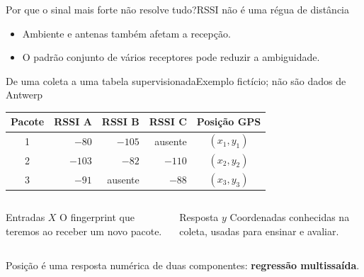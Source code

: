\begin{frame}{Por que o sinal mais forte não resolve tudo?}{RSSI não é uma régua de distância}
\centering
{}
\begin{itemize}
\item Ambiente e antenas também afetam a recepção.
\item O padrão conjunto de vários receptores pode reduzir a ambiguidade.
\end{itemize}
\end{frame}

\begin{frame}{De uma coleta a uma tabela supervisionada}{Exemplo fictício; não são dados de Antwerp}
\centering
\begin{tabular}{c r r r c}
\toprule
Pacote & RSSI A & RSSI B & RSSI C & Posição GPS\\
\midrule
1 & $-80$ & $-105$ & ausente & $(x_1,y_1)$\\
2 & $-103$ & $-82$ & $-110$ & $(x_2,y_2)$\\
3 & $-91$ & ausente & $-88$ & $(x_3,y_3)$\\
\bottomrule
\end{tabular}
\vspace{4mm}
\begin{columns}[T]
\begin{block}{Entradas $X$}
O fingerprint que teremos ao receber um novo pacote.
\end{block}
\begin{block}{Resposta $y$}
Coordenadas conhecidas na coleta, usadas para ensinar e avaliar.
\end{block}
\end{columns}
Posição é uma resposta numérica de duas componentes: \textbf{regressão multissaída}.
\end{frame}

